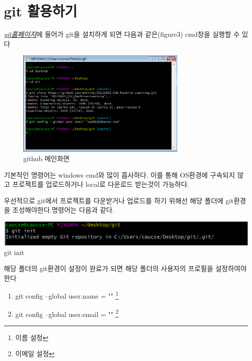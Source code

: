 \documentclass[12pt]{article}
\begin{document}
\section{git 활용하기}
	\textit{\href{https://git-scm.com/download/win}{git홈페이지}}에 들어가 git을 설치하게 되면 다음과 같은(figure3) cmd창을 실행할 수 있다
	\begin{figure}		
		\includegraphics[width=0.75\textwidth]{git_cmd}
		\caption{github 메인화면}
	\end{figure}

	
	기본적인 명령어는 windows cmd와 많이 흡사하다.
	이를 통해 OS환경에 구속되지 않고 프로젝트를 업로드하거나 local로 다운로드 받는것이 가능하다.
	
	우선적으로 git에서 프로젝트를 다운받거나 업로드를 하기 위해선 해당 폴더에 git환경을 조성해야한다.명령어는 다음과 같다.
	\begin{mdframed}[
		linecolor= black,
		roundcorner=10pt,
		innertopmargin =\topskip,
		leftmargin = 0.5cm,
		rightmargin = 0.5cm,
		frametitleaboveskip = 0.5pt,
		frametitlerulewidth = 0.5pt,
		frametitlealignment =,
		frametitlebackgroundcolor = yellow,			
		frametitle = {git환경 설정하기}	]
		\includegraphics[width=\textwidth]{git_init}
		git init		
	\end{mdframed}
	해당 폴더의 git환경이 설정이 완료가 되면 해당 폴더의 사용자의 프로필을 설정하여야 한다
	\begin{mdframed}[
		linecolor= black,
		roundcorner=10pt,
		innertopmargin =\topskip,
		leftmargin = 0.5cm,
		rightmargin = 0.5cm,
		frametitleaboveskip = 0.5pt,
		frametitlerulewidth = 0.5pt,
		frametitlealignment =,
		frametitlebackgroundcolor = yellow,			
		frametitle = {git프로필 설정하기}	]
		\begin{enumerate}
			\item git config --global user.name = "" \footnote{이름 설정}	
			\item git config --global user.email = ""	\footnote{이메일 설정}

		\end{enumerate}  		
	\end{mdframed}
\end{document}
